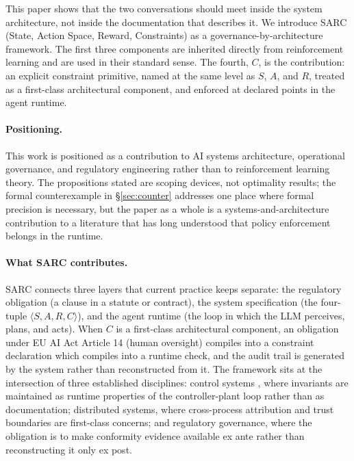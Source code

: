 \documentclass[11pt,a4paper]{article}
\theoremstyle{remark}
\begin{document}
This paper shows that the two conversations should meet inside the system architecture, not inside the documentation that describes it. We introduce SARC (State, Action Space, Reward, Constraints) as a governance-by-architecture framework. The first three components are inherited directly from reinforcement learning \cite{sutton2018rl} and are used in their standard sense. The fourth, $C$, is the contribution: an explicit constraint primitive, named at the same level as $S$, $A$, and $R$, treated as a first-class architectural component, and enforced at declared points in the agent runtime.

\paragraph{Positioning.} This work is positioned as a contribution to AI systems architecture, operational governance, and regulatory engineering rather than to reinforcement learning theory. The propositions stated are scoping devices, not optimality results; the formal counterexample in \S\ref{sec:counter} addresses one place where formal precision is necessary, but the paper as a whole is a systems-and-architecture contribution to a literature \cite{schneider2003enforcement,sandhu2007rolebased,fournet2003stack,jin2017opa} that has long understood that policy enforcement belongs in the runtime.

\paragraph{What SARC contributes.} SARC connects three layers that current practice keeps separate: the regulatory obligation (a clause in a statute or contract), the system specification (the four-tuple $\langle S, A, R, C \rangle$), and the agent runtime (the loop in which the LLM perceives, plans, and acts). When $C$ is a first-class architectural component, an obligation under EU AI Act Article 14 (human oversight) compiles into a constraint declaration which compiles into a runtime check, and the audit trail is generated by the system rather than reconstructed from it. The framework sits at the intersection of three established disciplines: control systems \cite{astrom2008feedback}, where invariants are maintained as runtime properties of the controller-plant loop rather than as documentation; distributed systems, where cross-process attribution and trust boundaries are first-class concerns; and regulatory governance, where the obligation is to make conformity evidence available ex ante rather than reconstructing it only ex post.
\end{document}
